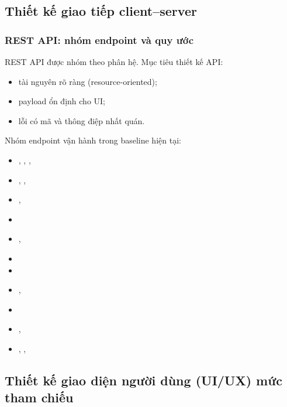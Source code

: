 \subsection{Thiết kế giao tiếp client--server}
\label{subsec:design-communication}

\subsubsection{REST API: nhóm endpoint và quy ước}
\label{subsubsec:design-rest}

REST API được nhóm theo phân hệ. Mục tiêu thiết kế API:
\begin{itemize}
    \item tài nguyên rõ ràng (resource-oriented);
    \item payload ổn định cho UI;
    \item lỗi có mã và thông điệp nhất quán.
\end{itemize}

Nhóm endpoint vận hành trong baseline hiện tại:
\begin{itemize}
    \item {}, , , 
    \item {}, , 
    \item {}, 
    \item {}
    \item {}, 
    \item {}
    \item {}
    \item {}, 
    \item {}
    \item {}, 
    \item {}, , 
\end{itemize}

\subsection{Thiết kế giao diện người dùng (UI/\allowbreak UX) mức tham chiếu}
\label{subsec:design-ui}

